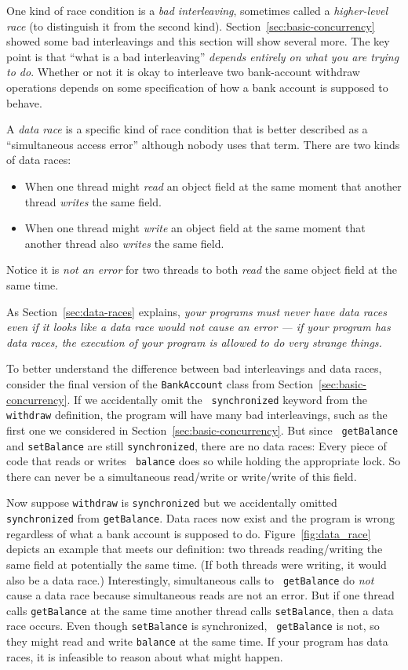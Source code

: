 \documentclass[10pt]{article}
\begin{document}
One kind of race condition is a \emph{bad interleaving}, sometimes
called a \emph{higher-level race} (to distinguish it from the second
kind).  Section~\ref{sec:basic-concurrency} showed some bad interleavings
and this section will show several more.  The key point is that ``what
is a bad interleaving'' \emph{depends entirely on what you are trying
  to do}.  Whether or not it is okay to interleave two bank-account
withdraw operations depends on some specification of how a bank
account is supposed to behave.

A \emph{data race} is a specific kind of race condition that is better
described as a ``simultaneous access error'' although nobody uses that
term.  There are two kinds of data races:
\begin{itemize}
\item When one thread might \emph{read} an object field at the same moment
  that another thread \emph{writes} the same field.
\item When one thread might \emph{write} an object field at the same moment
  that another thread also \emph{writes} the same field.
\end{itemize}
Notice it is \emph{not an error} for two threads to both \emph{read}
the same object field at the same time.  

As Section~\ref{sec:data-races} explains, \emph{your programs must
  never have data races even if it looks like a data race would not
  cause an error --- if your program has data races, the execution of
  your program is allowed to do very strange things.}

To better understand the difference between bad interleavings and data races,
consider the final version of the {\tt BankAccount} class from
Section~\ref{sec:basic-concurrency}.  If we accidentally omit the {\tt
  synchronized} keyword from the {\tt withdraw} definition, the
program will have many bad interleavings, such as the first one we
considered in Section~\ref{sec:basic-concurrency}.  But since {\tt
  getBalance} and {\tt setBalance} are still {\tt synchronized}, there
are no data races: Every piece of code that reads or writes {\tt
  balance} does so while holding the appropriate lock.  So there can
never be a simultaneous read/write or write/write of this field.

Now suppose {\tt withdraw} is {\tt synchronized} but we accidentally
omitted {\tt synchronized} from {\tt getBalance}.  Data races now
exist and the program is wrong regardless of what a bank account is
supposed to do.  Figure~\ref{fig:data_race} depicts an example that
meets our definition: two threads reading/writing the same field at
potentially the same time.  (If both threads were writing, it would
also be a data race.)  Interestingly, simultaneous calls to {\tt
  getBalance} do \emph{not} cause a data race because simultaneous
reads are not an error.  But if one thread calls {\tt getBalance} at
the same time another thread calls {\tt setBalance}, then a data race
occurs.  Even though {\tt setBalance} is synchronized, {\tt
  getBalance} is not, so they might read and write {\tt balance} at
the same time.  If your program has data races, it is infeasible to
reason about what might happen.
\end{document}

